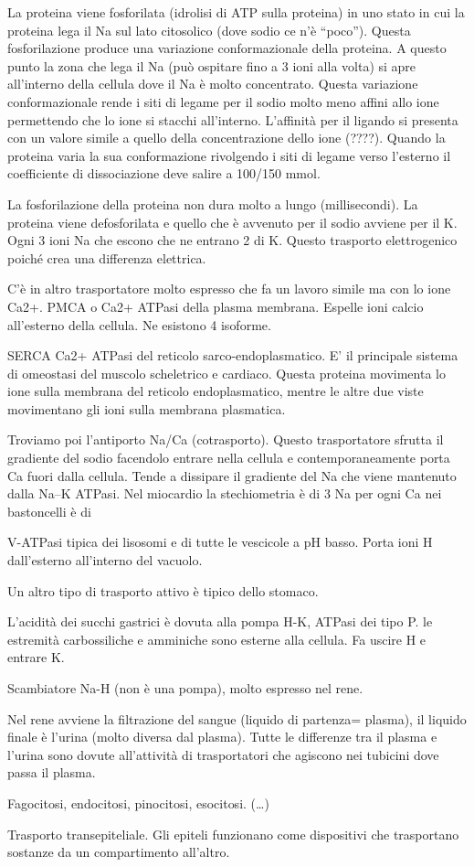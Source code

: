 \documentclass[]{article}
\begin{document}
La proteina viene fosforilata (idrolisi di ATP sulla proteina) in uno
stato in cui la proteina lega il Na sul lato citosolico (dove sodio ce
n'è ``poco''). Questa fosforilazione produce una variazione
conformazionale della proteina. A questo punto la zona che lega il Na
(può ospitare fino a 3 ioni alla volta) si apre all'interno della
cellula dove il Na è molto concentrato. Questa variazione
conformazionale rende i siti di legame per il sodio molto meno affini
allo ione permettendo che lo ione si stacchi all'interno. L'affinità per
il ligando si presenta con un valore simile a quello della
concentrazione dello ione (????). Quando la proteina varia la sua
conformazione rivolgendo i siti di legame verso l'esterno il
coefficiente di dissociazione deve salire a 100/150 mmol.

La fosforilazione della proteina non dura molto a lungo (millisecondi).
La proteina viene defosforilata e quello che è avvenuto per il sodio
avviene per il K. Ogni 3 ioni Na che escono che ne entrano 2 di K.
Questo trasporto elettrogenico poiché crea una differenza elettrica.

C'è in altro trasportatore molto espresso che fa un lavoro simile ma con
lo ione Ca2+. PMCA o Ca2+ ATPasi della plasma membrana. Espelle ioni
calcio all'esterno della cellula. Ne esistono 4 isoforme.

SERCA Ca2+ ATPasi del reticolo sarco-endoplasmatico. E' il principale
sistema di omeostasi del muscolo scheletrico e cardiaco. Questa proteina
movimenta lo ione sulla membrana del reticolo endoplasmatico, mentre le
altre due viste movimentano gli ioni sulla membrana plasmatica.

Troviamo poi l'antiporto Na/Ca (cotrasporto). Questo trasportatore
sfrutta il gradiente del sodio facendolo entrare nella cellula e
contemporaneamente porta Ca fuori dalla cellula. Tende a dissipare il
gradiente del Na che viene mantenuto dalla Na--K ATPasi. Nel miocardio
la stechiometria è di 3 Na per ogni Ca nei bastoncelli è di

V-ATPasi tipica dei lisosomi e di tutte le vescicole a pH basso. Porta
ioni H dall'esterno all'interno del vacuolo.

Un altro tipo di trasporto attivo è tipico dello stomaco.

L'acidità dei succhi gastrici è dovuta alla pompa H-K, ATPasi dei tipo
P. le estremità carbossiliche e amminiche sono esterne alla cellula. Fa
uscire H e entrare K.

Scambiatore Na-H (non è una pompa), molto espresso nel rene.

Nel rene avviene la filtrazione del sangue (liquido di partenza=
plasma), il liquido finale è l'urina (molto diversa dal plasma). Tutte
le differenze tra il plasma e l'urina sono dovute all'attività di
trasportatori che agiscono nei tubicini dove passa il plasma.

Fagocitosi, endocitosi, pinocitosi, esocitosi. (\ldots{})

Trasporto transepiteliale. Gli epiteli funzionano come dispositivi che
trasportano sostanze da un compartimento all'altro.
\end{document}
